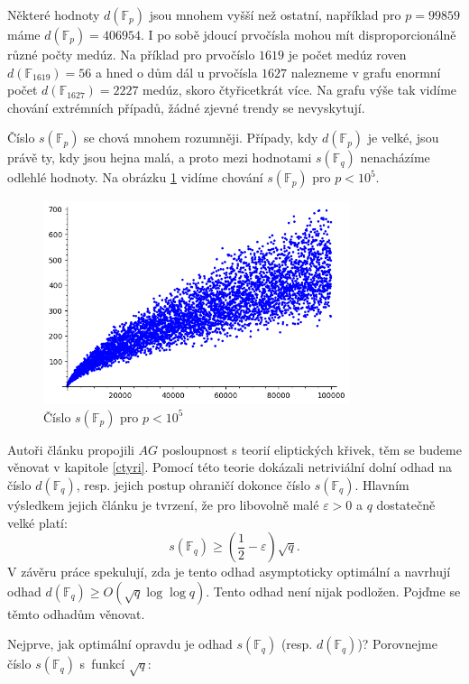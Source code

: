 \documentclass[12pt]{report}
\begin{document}
Některé hodnoty $d(\mathbb{F}_p)$ jsou mnohem vyšší než ostatní, například pro $p=99859$ máme $d(\mathbb{F}_p) = 406954$. I po sobě jdoucí prvočísla mohou mít disproporcionálně různé počty medúz. Na příklad pro prvočíslo $1619$ je počet medúz roven $d(\mathbb{F}_{1619}) = 56$ a hned o dům dál u prvočísla $1627$ nalezneme v grafu enormní počet $d(\mathbb{F}_{1627}) =2227$ medúz, skoro čtyřicetkrát více. Na grafu výše tak vidíme chování extrémních případů, žádné zjevné trendy se nevyskytují. 

Číslo $s(\mathbb{F}_p)$ se chová mnohem rozumněji. Případy, kdy $d(\mathbb{F}_p)$ je velké, jsou právě ty, kdy jsou hejna malá, a proto mezi hodnotami $s(\mathbb{F}_q)$ nenacházíme odlehlé hodnoty. Na obrázku \ref{fi} vidíme chování $s(\mathbb{F}_p)$ pro $p<10^5$.\\

\begin{figure}[h]
\centering
  \includegraphics[width=9cm]{SCount.png}
  \caption{Číslo $s(\mathbb{F}_p)$ pro $p < 10^5$}
   \label{fi}
\end{figure}


Autoři článku \cite{Meduza} propojili $AG$ posloupnost s teorií eliptických křivek, těm se budeme věnovat v kapitole \ref{ctyri}. Pomocí této teorie dokázali netriviální dolní odhad na číslo $d(\mathbb{F}_q)$, resp. jejich postup ohraničí dokonce číslo $s(\mathbb{F}_q)$. Hlavním výsledkem jejich článku je tvrzení, že pro libovolně malé $\varepsilon > 0$ a $q$ dostatečně velké platí:
$$s(\mathbb{F}_q) \geqslant \left( \frac{1}{2} - \varepsilon \right) \sqrt{q}.$$
V závěru práce spekulují, zda je tento odhad asymptoticky optimální a navrhují odhad $d(\mathbb{F}_q) \geqslant O(\sqrt{q} \log \log q)$. Tento odhad není nijak podložen. Pojďme se těmto odhadům věnovat.

Nejprve, jak optimální opravdu je odhad $s(\mathbb{F}_q)$ (resp. $d(\mathbb{F}_q)$)?  Porovnejme číslo $s(\mathbb{F}_q)$ s~funkcí $\sqrt{q}$:
\end{document}
